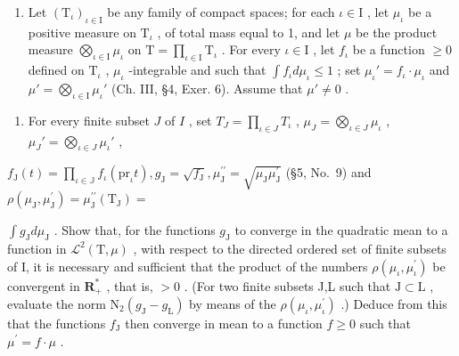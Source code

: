 \begin{enumerate}
\def\labelenumi{\arabic{enumi})}
\setcounter{enumi}{16}
\tightlist
\item
  Let \((\mathrm{T}_{\iota})_{\iota \in \mathrm{I}}\) be any family of compact spaces; for each \(\iota \in \mathrm{I}\) , let \(\mu_{\iota}\) be a positive measure on \(\mathrm{T}_{\iota}\) , of total mass equal to 1, and let \(\mu\) be the product measure \(\bigotimes_{\iota \in \mathrm{I}} \mu_{\iota}\) on \(\mathrm{T} = \prod_{\iota \in \mathrm{I}} \mathrm{T}_{\iota}\) . For every \(\iota \in \mathrm{I}\) , let \(f_{\iota}\) be a function \(\geqslant 0\) defined on \(\mathrm{T}_{\iota}\) , \(\mu_{\iota}\) -integrable and such that \(\int f_{\iota} d\mu_{\iota} \leqslant 1\) ; set \(\mu_{\iota}' = f_{\iota} \cdot \mu_{\iota}\) and \(\mu' = \bigotimes_{\iota \in \mathrm{I}} \mu_{\iota}'\) (Ch. III, §4, Exer. 6). Assume that \(\mu' \neq 0\) .
\end{enumerate}

\begin{enumerate}
\def\labelenumi{\alph{enumi})}
\tightlist
\item
  For every finite subset \(J\) of \(I\) , set \(T_J = \prod_{\iota \in J} T_\iota\) , \(\mu_J = \bigotimes_{\iota \in J} \mu_\iota\) , \(\mu_J' = \bigotimes_{\iota \in J} \mu_\iota'\) ,
\end{enumerate}

\(f_{\mathrm{J}}(t) = \prod_{\iota \in \mathbb{J}}f_{\iota}(\mathrm{pr}_{\iota}t), g_{\mathrm{J}} = \sqrt{f_{\mathrm{J}}}, \mu_{\mathrm{J}}^{\prime \prime} = \sqrt{\mu_{\mathrm{J}}\mu_{\mathrm{J}}^{\prime}}\) (§5, No.~9) and \(\rho (\mu_{\mathrm{J}},\mu_{\mathrm{J}}^{\prime}) = \mu_{\mathrm{J}}^{\prime \prime}(\mathrm{T}_{\mathrm{J}}) =\)

\(\int g_{\mathrm{J}}d\mu_{\mathrm{J}}\) . Show that, for the functions \(g_{\mathrm{J}}\) to converge in the quadratic mean to a function in \(\mathcal{L}^2 (\mathrm{T},\mu)\) , with respect to the directed ordered set of finite subsets of I, it is necessary and sufficient that the product of the numbers \(\rho (\mu_{\iota},\mu_{\iota}^{\prime})\) be convergent in \(\mathbf{R}_{+}^{*}\) , that is, \(>0\) . (For two finite subsets J,L such that \(\mathrm{J}\subset \mathrm{L}\) , evaluate the norm \(\mathrm{N}_2(g_{\mathrm{J}} - g_{\mathrm{L}})\) by means of the \(\rho (\mu_{\iota},\mu_{\iota}^{\prime})\) .) Deduce from this that the functions \(f_{\mathrm{J}}\) then converge in mean to a function \(f\geqslant 0\) such that \(\mu^{\prime} = f\cdot \mu\) .

